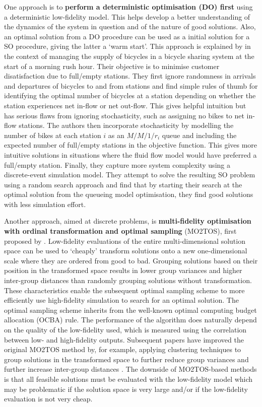 \documentclass[12pt,a4paper]{article}
\begin{document}
One approach is to \textbf{perform a deterministic optimisation (DO) first} using a deterministic low-fidelity model. This helps develop a better understanding of the dynamics of the system in question and of the nature of good solutions. Also, an optimal solution from a DO procedure can be used as a initial solution for a SO procedure, giving the latter a `warm start'. This approach is explained by \cite{jian2015introduction} in the context of managing the supply of bicycles in a bicycle sharing system at the start of a morning rush hour. Their objective is to minimise customer disatisfaction due to full/empty stations. They first ignore randomness in arrivals and departures of bicycles to and from stations and find simple rules of thumb for identifying the optimal number of bicycles at a station depending on whether the station experiences net in-flow or net out-flow. This gives helpful intuition but has serious flaws from ignoring stochasticity, such as assigning no bikes to net in-flow stations. The authors then incorporate stochasticity by modelling the number of bikes at each station $i$ as an $M/M/1/r_i$ queue and including the expected number of full/empty stations in the objective function. This gives more intuitive solutions in situations where the fluid flow model would have preferred a full/empty station. Finally, they capture more system complexity using a discrete-event simulation model. They attempt to solve the resulting SO problem using a random search approach and find that by starting their search at the optimal solution from the queueing model optimisation, they find good solutions with less simulation effort.

Another approach, aimed at discrete problems, is \textbf{multi-fidelity optimisation with ordinal transformation and optimal sampling} (MO2TOS), first proposed by \cite{xu2016mo2tos}. Low-fidelity evaluations of the entire multi-dimensional solution space can be used to `cheaply' transform solutions onto a new one-dimensional scale where they are ordered from good to bad. Grouping solutions based on their position in the transformed space results in lower group variances and higher inter-group distances than randomly grouping solutions without transformation. These characteristics enable the subsequent optimal sampling scheme to more efficiently use high-fidelity simulation to search for an optimal solution. The optimal sampling scheme inherits from the well-known optimal computing budget allocation (OCBA) rule. The performance of the algorithm does naturally depend on the quality of the low-fidelity used, which is measured using the correlation between low- and high-fidelity outputs. Subsequent papers have improved the original MO2TOS method by, for example, applying clustering techniques to group solutions in the transformed space to further reduce group variances and further increase inter-group distances \citep{cao2023cluster}. The downside of MO2TOS-based methods is that all feasible solutions must be evaluated with the low-fidelity model which may be problematic if the solution space is very large and/or if the low-fidelity evaluation is not very cheap.
\end{document}
